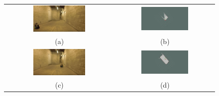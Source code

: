 \begin{figure}
  \begin{tabular}{cc}
    \centering \footnotesize
    \includegraphics[width=0.50\textwidth]{images/KobukiSotano1.png}&
    \includegraphics[width=0.50\textwidth]{images/Slam_1.PNG}\\
    (a)&(b)\\
    \includegraphics[width=0.50\textwidth]{images/KobukiSotano2.png}&
    \includegraphics[width=0.50\textwidth]{images/Slam_2.PNG}\\
    (c)&(d)\\

\end{tabular}
\end{figure}
